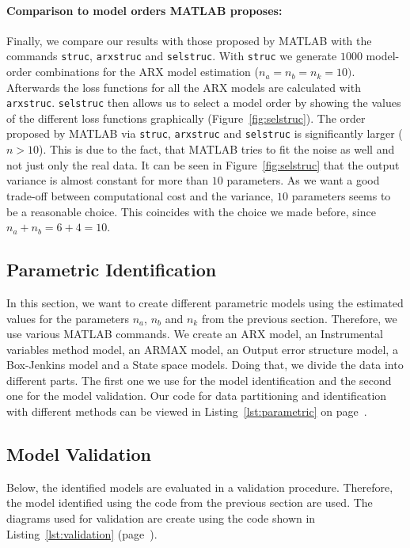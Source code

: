 \paragraph{Comparison to model orders MATLAB proposes:} Finally, we compare our results with those proposed by MATLAB with the commands \texttt{struc}, \texttt{arxstruc} and \texttt{selstruc}. 
With \texttt{struc} we generate $1000$ model-order combinations for the ARX model estimation ($n_a = n_b = n_k = 10)$. Afterwards the loss functions for all the ARX models are calculated with \texttt{arxstruc}. \texttt{selstruc} then allows us to select a model order by showing the values of the different loss functions graphically (Figure~\ref{fig:selstruc}). 
The order proposed by MATLAB via \texttt{struc}, \texttt{arxstruc} and \texttt{selstruc} is significantly larger ($n > 10$). 
This is due to the fact, that MATLAB tries to fit the noise as well and not just only the real data. 
It can be seen in Figure~\ref{fig:selstruc} that the output variance is almost constant for more than $10$ parameters.
As we want a good trade-off between computational cost and the variance, $10$ parameters seems to be a reasonable choice.
This coincides with the choice we made before, since $n_a + n_b = 6 + 4 = 10$. 

\subsection{Parametric Identification}
In this section, we want to create different parametric models using the estimated values for the parameters $n_a$, $n_b$ and $n_k$ from the previous section. 
Therefore, we use various MATLAB commands. 
We create an ARX model, an Instrumental variables method model, an ARMAX model, an Output error structure model, a Box-Jenkins model and a State space models.
Doing that, we divide the data into different parts. 
The first one we use for the model identification and the second one for the model validation. 
Our code for data partitioning and identification with different methods can be viewed in Listing~\ref{lst:parametric} on page~\pageref{lst:parametric}.

\FloatBarrier
\subsection{Model Validation}
Below, the identified models are evaluated in a validation procedure.
Therefore, the model identified using the code from the previous section are used.
The diagrams used for validation are create using the code shown in Listing~\ref{lst:validation} (page~\pageref{lst:validation}).

